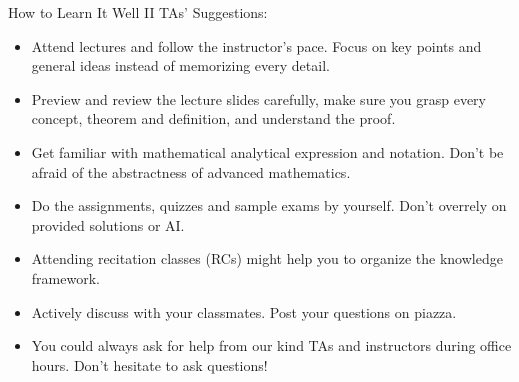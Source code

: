 \documentclass[dvipsnames]{beamer}
\begin{document}
\begin{frame}{How to Learn It Well II}
    TAs' Suggestions:
    \begin{itemize}
        \item Attend lectures and follow the instructor's pace. Focus on key points and general ideas instead of memorizing every detail.
        \item Preview and review the lecture slides carefully, make sure you grasp every concept, theorem and definition, and understand the proof.
        \item Get familiar with mathematical analytical expression and notation. Don't be afraid of the abstractness of advanced mathematics.
        \item Do the assignments, quizzes and sample exams by yourself. Don't overrely on provided solutions or AI.
        \item Attending recitation classes (RCs) might help you to organize the knowledge framework.
        \item Actively discuss with your classmates. Post your questions on piazza.
        \item You could always ask for help from our kind TAs and instructors during office hours. Don't hesitate to ask questions!
    \end{itemize}
\end{frame}
\end{document}
